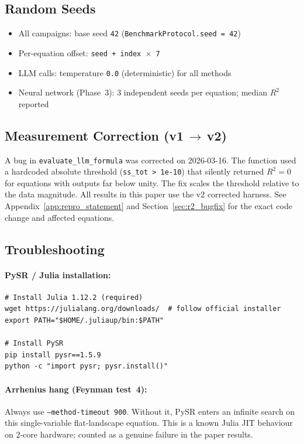 \documentclass[11pt,a4paper]{article}
\begin{document}
\subsection{Random Seeds}

\begin{itemize}
\item All campaigns: base seed \texttt{42} (\texttt{BenchmarkProtocol.seed = 42})
\item Per-equation offset: \texttt{seed + index $\times$ 7}
\item LLM calls: temperature \texttt{0.0} (deterministic) for all methods
\item Neural network (Phase~3): 3 independent seeds per equation; median $R^2$ reported
\end{itemize}

\subsection{Measurement Correction (v1\,$\to$\,v2)}

A bug in \texttt{evaluate\_llm\_formula} was corrected on 2026-03-16.
The function used a hardcoded absolute threshold (\texttt{ss\_tot > 1e-10})
that silently returned $R^2=0$ for equations with outputs far below unity.
The fix scales the threshold relative to the data magnitude.
All results in this paper use the v2 corrected harness.
See Appendix~\ref{app:repro_statement} and Section~\ref{sec:r2_bugfix}
for the exact code change and affected equations.

\subsection{Troubleshooting}

\paragraph{PySR / Julia installation:}
\begin{small}
\begin{verbatim}
# Install Julia 1.12.2 (required)
wget https://julialang.org/downloads/  # follow official installer
export PATH="$HOME/.juliaup/bin:$PATH"

# Install PySR
pip install pysr==1.5.9
python -c "import pysr; pysr.install()"
\end{verbatim}
\end{small}

\paragraph{Arrhenius hang (Feynman test~4):}
Always use \texttt{--method-timeout 900}. Without it, PySR enters an
infinite search on this single-variable flat-landscape equation.
This is a known Julia JIT behaviour on 2-core hardware; counted as a
genuine failure in the paper results.
\end{document}
